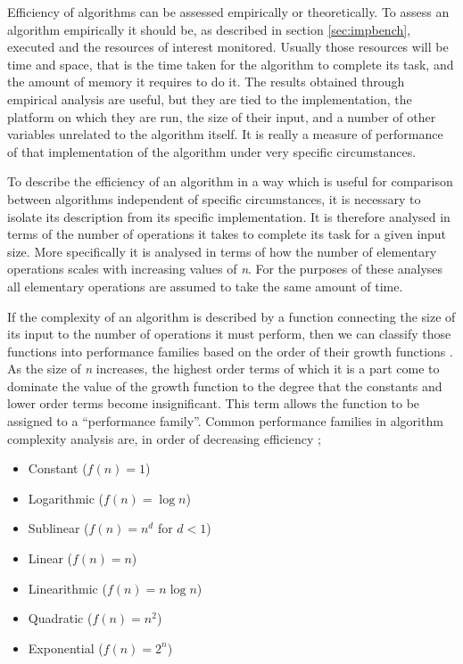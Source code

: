 \documentclass[12pt, a4paper]{article}
\begin{document}
Efficiency of algorithms can be assessed empirically or theoretically. To assess an algorithm empirically it should be, as described in section \ref{sec:impbench}, executed and the resources of interest monitored. Usually those resources will be time and space, that is the time taken for the algorithm to complete its task, and the amount of memory it requires to do it. The results obtained through empirical analysis are useful, but they are tied to the implementation, the platform on which they are run, the size of their input, and a number of other variables unrelated to the algorithm itself. It is really a measure of performance of that implementation of the algorithm under very specific circumstances.

To describe the efficiency of an algorithm in a way which is useful for comparison between algorithms independent of specific circumstances, it is necessary to isolate its description from its specific implementation. It is therefore analysed in terms of the number of operations it takes to complete its task for a given input size. More specifically it is analysed in terms of how the number of elementary operations scales with increasing values of \emph{n}. For the purposes of these analyses all elementary operations are assumed to take the same amount of time.

If the complexity of an algorithm is described by a function connecting the size of its input to the number of operations it must perform, then we can classify those functions into performance families based on the order of their growth functions \autocite[18]{heineman2016algorithms}. As the size of \emph{n} increases, the highest order terms of which it is a part come to dominate the value of the growth function to the degree that the constants and lower order terms become insignificant. This term allows the function to be assigned to a ``performance family''. Common performance families in algorithm complexity analysis are, in order of decreasing efficiency \autocite[19]{heineman2016algorithms};

\begin{itemize}
    \item Constant ($f(n)=1$)
    \item Logarithmic ($f(n) = \log n$)
    \item Sublinear ($f(n) = n^{d}$ for $d<1$)
    \item Linear ($f(n) = n$)
    \item Linearithmic ($f(n) = n\log n$)
    \item Quadratic ($f(n) = n^{2}$)
    \item Exponential ($f(n) = 2^{n}$)
\end{itemize}
\end{document}
